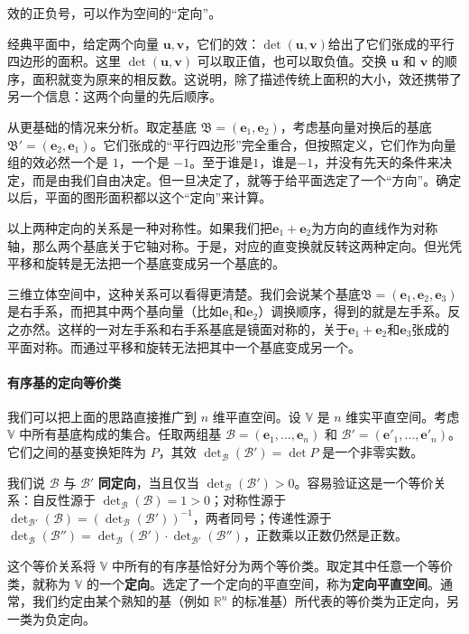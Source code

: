 \documentclass[12pt,UTF8,fontset=none]{ctexbook}
\begin{document}
效的正负号，可以作为空间的“定向”。

经典平面中，给定两个向量 $\mathbf{u}, \mathbf{v}$，它们的效：$\det(\mathbf{u}, \mathbf{v})$给出了它们张成的平行四边形的面积。这里 $\det(\mathbf{u}, \mathbf{v})$ 可以取正值，也可以取负值。交换 $\mathbf{u}$ 和 $\mathbf{v}$ 的顺序，面积就变为原来的相反数。这说明，除了描述传统上面积的大小，效还携带了另一个信息：这两个向量的先后顺序。

从更基础的情况来分析。取定基底 $\mathfrak{B} = (\mathbf{e}_1, \mathbf{e}_2)$，考虑基向量对换后的基底 $\mathfrak{B}' = (\mathbf{e}_2, \mathbf{e}_1)$。它们张成的“平行四边形”完全重合，但按照定义，它们作为向量组的效必然一个是 $1$，一个是 $-1$。至于谁是$1$，谁是$-1$，并没有先天的条件来决定，而是由我们自由决定。但一旦决定了，就等于给平面选定了一个“方向”。确定以后，平面的图形面积都以这个“定向”来计算。

以上两种定向的关系是一种对称性。如果我们把$\mathbf{e}_1+\mathbf{e}_2$为方向的直线作为对称轴，那么两个基底关于它轴对称。于是，对应的直变换就反转这两种定向。但光凭平移和旋转是无法把一个基底变成另一个基底的。

三维立体空间中，这种关系可以看得更清楚。我们会说某个基底$\mathfrak{B} = (\mathbf{e}_1, \mathbf{e}_2, \mathbf{e}_3)$是右手系，而把其中两个基向量（比如$\mathbf{e}_1$和$\mathbf{e}_2$）调换顺序，得到的就是左手系。反之亦然。这样的一对左手系和右手系基底是镜面对称的，关于$\mathbf{e}_1+\mathbf{e}_2$和$\mathbf{e}_3$张成的平面对称。而通过平移和旋转无法把其中一个基底变成另一个。

\paragraph{有序基的定向等价类}
我们可以把上面的思路直接推广到 $n$ 维平直空间。设 $\mathbb{V}$ 是 $n$ 维实平直空间。考虑 $\mathbb{V}$ 中所有基底构成的集合。任取两组基 $\mathcal{B} = (\mathbf{e}_1, \dots, \mathbf{e}_n)$ 和 $\mathcal{B}' = (\mathbf{e}'_1, \dots, \mathbf{e}'_n)$。它们之间的基变换矩阵为 $P$，其效 $\det_{\mathcal{B}}(\mathcal{B}') = \det P$ 是一个非零实数。

我们说 $\mathcal{B}$ 与 $\mathcal{B}'$ \textbf{同定向}，当且仅当 $\det_{\mathcal{B}}(\mathcal{B}') > 0$。容易验证这是一个等价关系：自反性源于 $\det_{\mathcal{B}}(\mathcal{B}) = 1 > 0$；对称性源于 $\det_{\mathcal{B}'}(\mathcal{B}) = (\det_{\mathcal{B}}(\mathcal{B}'))^{-1}$，两者同号；传递性源于 $\det_{\mathcal{B}}(\mathcal{B}'') = \det_{\mathcal{B}}(\mathcal{B}') \cdot \det_{\mathcal{B}'}(\mathcal{B}'')$，正数乘以正数仍然是正数。

这个等价关系将 $\mathbb{V}$ 中所有的有序基恰好分为两个等价类。取定其中任意一个等价类，就称为 $\mathbb{V}$ 的一个\textbf{定向}。选定了一个定向的平直空间，称为\textbf{定向平直空间}。通常，我们约定由某个熟知的基（例如 $\mathbb{R}^n$ 的标准基）所代表的等价类为正定向，另一类为负定向。
\end{document}
